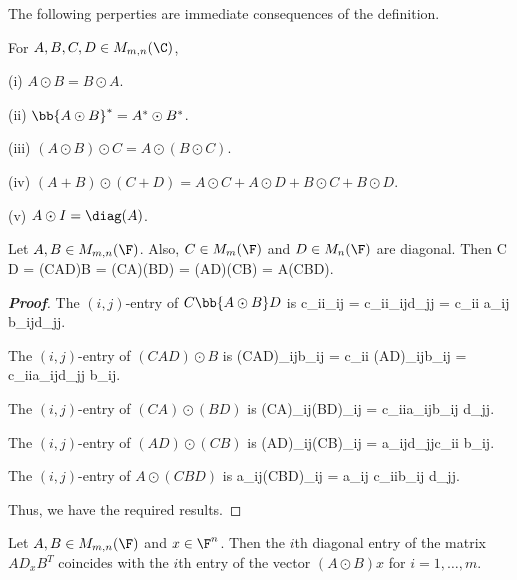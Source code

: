 The following perperties are immediate consequences of the definition.

\begin{proposition}\label{pro:hadamard_product_basic_properties}
For $A,B,C,D\in M_{m,n}(\C)$, 
\ben
\item [(i)] $A\odot B = B \odot A$.
\item [(ii)] $\bb{A\odot B}^* = A^* \odot B^*$.
\item [(iii)] $(A\odot B)\odot C = A\odot (B\odot C)$.
\item [(iv)] $(A+B)\odot (C+D) = A\odot C+A\odot D+B\odot C+B\odot D$.
\item [(v)] $A\odot I = \diag(A)$.
\een
\end{proposition}


\begin{lemma}\label{lem:hadamard_product_commute}
Let $A,B\in M_{m,n}(\F)$. Also, $C\in M_m(\F)$ and $D \in M_n(\F)$ are diagonal. Then
\be
C D = (CAD)\odot B = (CA)\odot(BD) = (AD)\odot (CB) = A\odot (CBD).
\ee
\end{lemma}

\begin{proof}[\bf Proof]
The $(i,j)$-entry of $C\bb{A\odot B} D$ is 
\be
c_{ii}_{ij} = c_{ii}_{ij}d_{jj} = c_{ii} a_{ij} b_{ij}d_{jj}.
\ee

The $(i,j)$-entry of $(CAD)\odot B$ is 
\be
(CAD)_{ij}b_{ij} = c_{ii} (AD)_{ij}b_{ij} = c_{ii}a_{ij}d_{jj} b_{ij}.
\ee

The $(i,j)$-entry of $(CA)\odot(BD)$ is
\be
(CA)_{ij}(BD)_{ij} = c_{ii}a_{ij}b_{ij} d_{jj}.
\ee

The $(i,j)$-entry of $(AD)\odot (CB)$ is
\be
(AD)_{ij}(CB)_{ij} = a_{ij}d_{jj}c_{ii} b_{ij}.
\ee

The $(i,j)$-entry of $A\odot (CBD)$ is
\be
a_{ij}(CBD)_{ij} = a_{ij} c_{ii}b_{ij} d_{jj}.
\ee

Thus, we have the required results.
\end{proof}



\begin{lemma}\label{lem:hadamard_product_diagonal_entry_equals_vector_entry}
Let $A,B\in M_{m,n}(\F)$ and $x\in \F^n$. Then the $i$th diagonal entry of the matrix $AD_xB^T$ coincides with the $i$th entry of the vector $(A\odot B)x$ for $i = 1,\dots,m$.
\end{lemma}

